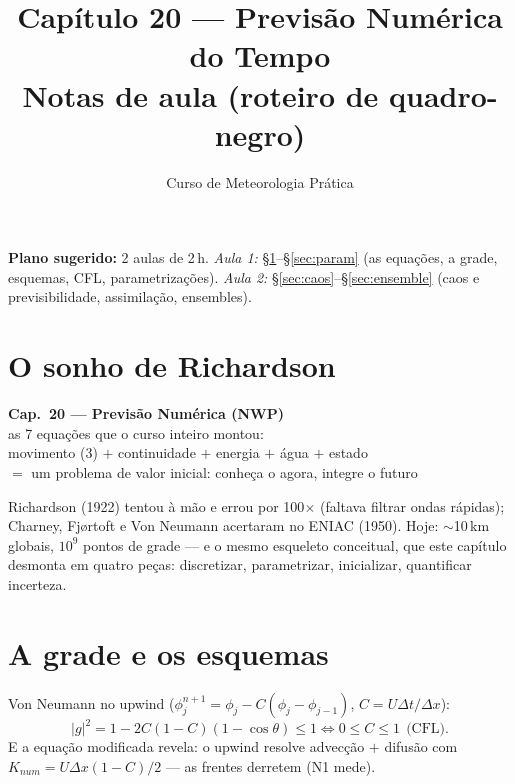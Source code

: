 \documentclass[11pt]{article}
\title{Capítulo 20 --- Previsão Numérica do Tempo\\
{\large Notas de aula (roteiro de quadro-negro)}}
\author{Curso de Meteorologia Prática}
\date{}
\begin{document}
\maketitle
\thispagestyle{fancy}

\noindent\textbf{Plano sugerido:} 2 aulas de 2\,h.
\emph{Aula 1:} \S\ref{sec:eqs}--\S\ref{sec:param} (as equações, a
grade, esquemas, CFL, parametrizações).
\emph{Aula 2:} \S\ref{sec:caos}--\S\ref{sec:ensemble} (caos e
previsibilidade, assimilação, ensembles).

\section{O sonho de Richardson}\label{sec:eqs}

\begin{noquadro}[abertura]
\textbf{Cap.~20 --- Previsão Numérica (NWP)}\\[2pt]
as 7 equações que o curso inteiro montou:\\
movimento (3)  $+$ continuidade
 $+$ energia  $+$ água
 $+$ estado \\[2pt]
$=$ um problema de valor inicial: conheça o agora, integre o futuro
\end{noquadro}

Richardson (1922) tentou à mão e errou por 100$\times$ (faltava
filtrar ondas rápidas); Charney, Fjørtoft e Von Neumann acertaram no
ENIAC (1950). Hoje: $\sim$10\,km globais, $10^9$ pontos de grade — e o
mesmo esqueleto conceitual, que este capítulo desmonta em quatro
peças: discretizar, parametrizar, inicializar, quantificar incerteza.

\section{A grade e os esquemas}\label{sec:grade}


\begin{formadif}
Von Neumann no upwind ($\phi_j^{n+1} = \phi_j - C(\phi_j -
\phi_{j-1})$, $C = U\Delta t/\Delta x$):
\[ |g|^2 = 1 - 2C(1-C)(1-\cos\theta) \le 1
\iff 0 \le C \le 1\ \ \text{(CFL)}. \]
E a equação modificada revela: o upwind resolve advecção $+$ difusão
com $K_{num} = U\Delta x(1-C)/2$ — as frentes derretem
 (N1 mede).
\end{formadif}
\end{document}
